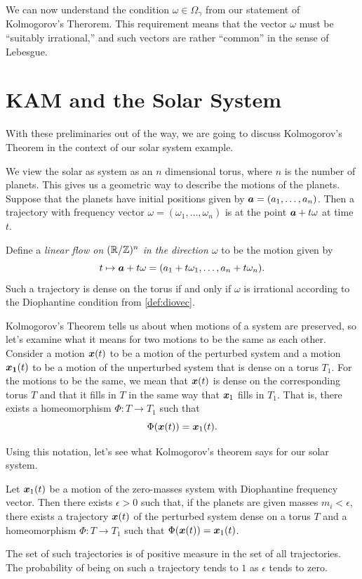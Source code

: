 \documentclass[twoside,letterpaper,10pt]{article}
\begin{document}
We can now understand the condition $\omega \in \Omega_{\gamma}$ from our
statement of Kolmogorov's Therorem.
This requirement means that the vector $\omega$ must be ``suitably irrational,''
and such vectors are rather ``common'' in the sense of Lebesgue.


\section{KAM and the Solar System}
\label{sec:kam-solar-system}

With these preliminaries out of the way, we are going to discuss Kolmogorov's
Theorem in the context of our solar system example.

We view the solar as system as an $n$ dimensional torus, where $n$ is the number
of planets.
This gives us a geometric way to describe the motions of the planets.
Suppose that the planets have initial positions given by $\bm{a} = (a_1, \ldots,
a_n)$.
Then a trajectory with frequency vector $\omega = (\omega_1, \ldots, \omega_n)$
is at the point $\bm{a} + t \omega$ at time $t$.

Define a \emph{linear flow on $(\mathbb{R}/\mathbb{Z})^n$ in the direction $\omega$} to be the
motion given by
\begin{equation*}
  t \mapsto \bm{a} + t \omega = (a_1 + t \omega_1, \ldots, a_n + t \omega_n).
\end{equation*}
Such a trajectory is dense on the torus if and only if $\omega$ is irrational
according to the Diophantine condition from \cref{def:diovec}.

Kolmogorov's Theorem tells us about when motions of a system are preserved, so
let's examine what it means for two motions to be the same as each other.
Consider a motion $\bm{x}(t)$ to be a motion of the perturbed system and a
motion $\bm{x_1}(t)$ to be a motion of the unperturbed system that is dense on a
torus $T_1$.
For the motions to be the same, we mean that $\bm{x}(t)$ is dense on the
corresponding torus $T$ and that it fills in $T$ in the same way that $\bm{x}_1$
fills in $T_1$.
That is, there exists a homeomorphism $\Phi : T \to T_1$ such that
\begin{equation*}
  \Phi(\bm{x}(t)) = \bm{x}_1(t).
\end{equation*}

Using this notation, let's see what Kolmogorov's theorem says for our solar
system.
\begin{thm}
  Let $\bm{x}_1(t)$ be a motion of the zero-masses system with Diophantine
  frequency vector.
  Then there exists $\epsilon > 0$ such that, if the planets are given masses
  $m_i < \epsilon$, there exists a trajectory $\bm{x}(t)$ of the perturbed
  system dense on a torus $T$ and a homeomorphism $\Phi : T \to T_1$ such that
  $\Phi(\bm{x}(t)) = \bm{x}_1(t)$.

  The set of such trajectories is of positive measure in the set of all
  trajectories.
  The probability of being on such a trajectory tends to $1$ as $\epsilon$ tends
  to zero.
\end{thm}
\end{document}

